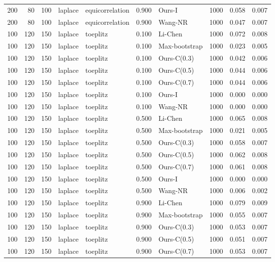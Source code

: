 \begin{tabular}{rrrllrlrrr}
200 & 80 & 100 & laplace & equicorrelation & 0.900 & Ours-I & 1000 & 0.058 & 0.007 \\
200 & 80 & 100 & laplace & equicorrelation & 0.900 & Wang-NR & 1000 & 0.047 & 0.007 \\
100 & 120 & 150 & laplace & toeplitz & 0.100 & Li-Chen & 1000 & 0.072 & 0.008 \\
100 & 120 & 150 & laplace & toeplitz & 0.100 & Max-bootstrap & 1000 & 0.023 & 0.005 \\
100 & 120 & 150 & laplace & toeplitz & 0.100 & Ours-C(0.3) & 1000 & 0.042 & 0.006 \\
100 & 120 & 150 & laplace & toeplitz & 0.100 & Ours-C(0.5) & 1000 & 0.044 & 0.006 \\
100 & 120 & 150 & laplace & toeplitz & 0.100 & Ours-C(0.7) & 1000 & 0.044 & 0.006 \\
100 & 120 & 150 & laplace & toeplitz & 0.100 & Ours-I & 1000 & 0.000 & 0.000 \\
100 & 120 & 150 & laplace & toeplitz & 0.100 & Wang-NR & 1000 & 0.000 & 0.000 \\
100 & 120 & 150 & laplace & toeplitz & 0.500 & Li-Chen & 1000 & 0.065 & 0.008 \\
100 & 120 & 150 & laplace & toeplitz & 0.500 & Max-bootstrap & 1000 & 0.021 & 0.005 \\
100 & 120 & 150 & laplace & toeplitz & 0.500 & Ours-C(0.3) & 1000 & 0.058 & 0.007 \\
100 & 120 & 150 & laplace & toeplitz & 0.500 & Ours-C(0.5) & 1000 & 0.062 & 0.008 \\
100 & 120 & 150 & laplace & toeplitz & 0.500 & Ours-C(0.7) & 1000 & 0.061 & 0.008 \\
100 & 120 & 150 & laplace & toeplitz & 0.500 & Ours-I & 1000 & 0.000 & 0.000 \\
100 & 120 & 150 & laplace & toeplitz & 0.500 & Wang-NR & 1000 & 0.006 & 0.002 \\
100 & 120 & 150 & laplace & toeplitz & 0.900 & Li-Chen & 1000 & 0.079 & 0.009 \\
100 & 120 & 150 & laplace & toeplitz & 0.900 & Max-bootstrap & 1000 & 0.055 & 0.007 \\
100 & 120 & 150 & laplace & toeplitz & 0.900 & Ours-C(0.3) & 1000 & 0.053 & 0.007 \\
100 & 120 & 150 & laplace & toeplitz & 0.900 & Ours-C(0.5) & 1000 & 0.051 & 0.007 \\
100 & 120 & 150 & laplace & toeplitz & 0.900 & Ours-C(0.7) & 1000 & 0.053 & 0.007 \\

\end{tabular}
